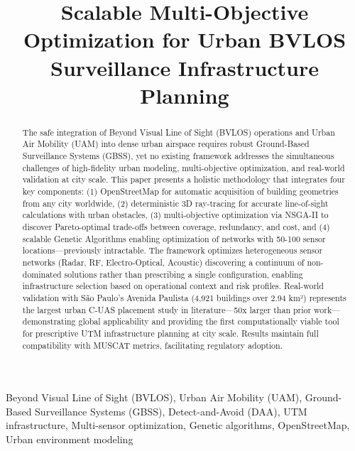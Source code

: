 \documentclass[conference]{IEEEtran}
\begin{document}
\title{Scalable Multi-Objective Optimization for Urban BVLOS Surveillance Infrastructure Planning}

\author{
}

\maketitle

\begin{abstract}
The safe integration of Beyond Visual Line of Sight (BVLOS) operations and Urban Air Mobility (UAM) into dense urban airspace requires robust Ground-Based Surveillance Systems (GBSS), yet no existing framework addresses the simultaneous challenges of high-fidelity urban modeling, multi-objective optimization, and real-world validation at city scale. This paper presents a holistic methodology that integrates four key components: (1) OpenStreetMap for automatic acquisition of building geometries from any city worldwide, (2) deterministic 3D ray-tracing for accurate line-of-sight calculations with urban obstacles, (3) multi-objective optimization via NSGA-II to discover Pareto-optimal trade-offs between coverage, redundancy, and cost, and (4) scalable Genetic Algorithms enabling optimization of networks with 50-100 sensor locations—previously intractable. The framework optimizes heterogeneous sensor networks (Radar, RF, Electro-Optical, Acoustic) discovering a continuum of non-dominated solutions rather than prescribing a single configuration, enabling infrastructure selection based on operational context and risk profiles. Real-world validation with São Paulo's Avenida Paulista (4,921 buildings over 2.94 km²) represents the largest urban C-UAS placement study in literature—50x larger than prior work—demonstrating global applicability and providing the first computationally viable tool for prescriptive UTM infrastructure planning at city scale. Results maintain full compatibility with MUSCAT metrics, facilitating regulatory adoption.
\end{abstract}

\begin{IEEEkeywords}
Beyond Visual Line of Sight (BVLOS), Urban Air Mobility (UAM), Ground-Based Surveillance Systems (GBSS), Detect-and-Avoid (DAA), UTM infrastructure, Multi-sensor optimization, Genetic algorithms, OpenStreetMap, Urban environment modeling
\end{IEEEkeywords}
\end{document}

